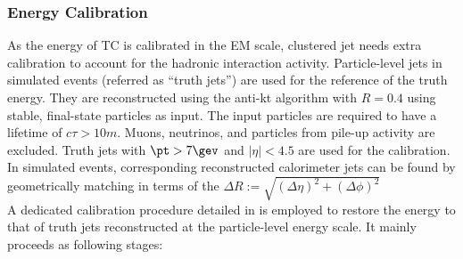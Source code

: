 


\subsubsection{Energy Calibration} \label{sec::objDef::jets::calib}
As the energy of TC is calibrated in the EM scale, clustered jet needs extra calibration to account for the hadronic interaction activity. Particle-level jets in simulated events (referred as ``truth jets'') are used for the reference of the truth energy. They are reconstructed using the anti-kt algorithm with $R=0.4$ using stable, final-state particles as input. The input particles are required to have a lifetime of $c\tau > 10m$. Muons, neutrinos, and particles from pile-up activity are excluded. Truth jets with $\pt>7\gev$ and $|\eta|<4.5$ are used for the calibration. In simulated events, corresponding reconstructed calorimeter jets can be found by geometrically matching in  terms of the $\Delta R := \sqrt{(\Delta \eta)^2+(\Delta \phi)^2}$ \\

A dedicated calibration procedure detailed in \cite{144_JESmeas_2015data} is employed
to restore the energy to that of truth jets reconstructed at the particle-level energy scale. It mainly proceeds as following stages:


